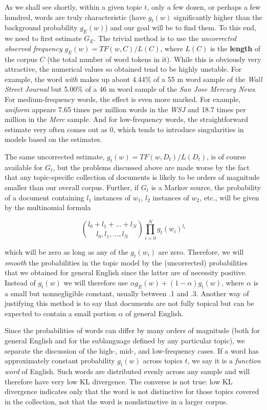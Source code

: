 As we shall see shortly, within a given topic $t$, only a few dozen, or
perhaps a few hundred, words are truly characteristic (have $g_t(w)$
significantly higher than the background probability $g_E(w)$) and our goal
will be to find them. To this end, we need to first estimate $G_E$. The
trivial method is to use the {\it uncorrected observed frequency}
$g_E(w)=TF(w,C)/L(C)$, where $L(C)$ is the {\bf length} of the corpus $C$ (the
total number of word tokens in it). While this is obviously very attractive,
the numerical values so obtained tend to be highly unstable. For example, the
word {\it with} makes up about 4.44\% of a 55 m word sample of the {\it Wall
  Street Journal} but 5.00\% of a 46 m word sample of the {\it San Jose
  Mercury News}.  For medium-frequency words, the effect is even more
marked. For example, {\it uniform} appears 7.65 times per million words in the
{\it WSJ} and 18.7 times per million in the {\it Merc} sample. And for
low-frequency words, the straightforward estimate very often comes out as 0,
which tends to introduce singularities in models based on the estimates.

The same uncorrected estimate, $g_t(w)=TF(w,D_t)/L(D_t)$, is of course
available for $G_t$, but the problems discussed above are made worse by the
fact that any topic-specific collection of documents is likely to be orders of
magnitude smaller than our overall corpus. Further, if $G_t$ is a Markov
source, the probability of a document containing $l_1$ instances of $w_1$,
$l_2$ instances of $w_2$, etc., will be given by the multinomial formula

\begin{equation}
{{l_0+l_1+\ldots +l_N}\choose{l_0,l_1,\ldots ,l_N}} \prod_{i=0}^N g_t(w_i)^{l_i}
\end{equation}

\noindent
which will be zero as long as any of the $g_t(w_i)$ are zero. Therefore, we
will {\it smooth} the probabilities in the topic model by the (uncorrected)
probabilities that we obtained for general English since the latter are of
necessity positive. Instead of $g_t(w)$ we will therefore use $ \alpha g_E(w)
+ (1-\alpha )g_t(w)$, where $\alpha$ is a small but nonnegligible constant,
usually between .1 and .3. %
Another way of justifying this method is to say that documents are not fully
topical but can be expected to contain a small portion $\alpha$ of general
English.

Since the probabilities of words can differ by many orders of magnitude (both
for general English and for the sublanguage defined by any particular topic),
we separate the discussion of the high-, mid-, and low-frequency cases.  If a
word has approximately constant probability $g_t(w)$ across topics $t$, we say
it is a {\it function word} of English.  Such words are
distributed evenly across any sample and will therefore have very low KL
divergence. The converse is not true: low KL divergence indicates only that
the word is not distinctive for those topics covered in the collection, not
that the word is nondistinctive in a larger corpus. 

